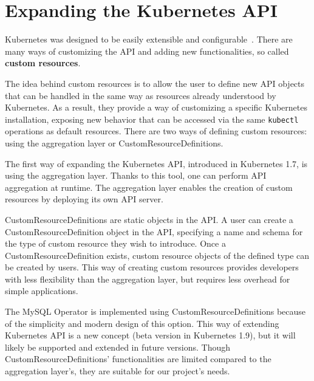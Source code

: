 \section{Expanding the Kubernetes API}
Kubernetes was designed to be easily extensible and configurable~\cite{extending-kubeapi}. There are
many ways of customizing the API and adding new functionalities, so called \textbf{custom resources}.

The idea behind custom resources is to allow the user to define new API objects that can be handled
in the same way as resources already understood by Kubernetes. As a result, they provide a way of
customizing a specific Kubernetes installation, exposing new behavior that can be accessed via the
same \texttt{kubectl} operations as default resources. There are two ways of defining custom resources: using
the aggregation layer or CustomResourceDefinitions.

The first way of expanding the Kubernetes API, introduced in Kubernetes 1.7, is using the
aggregation layer. Thanks to this tool, one can perform API aggregation at runtime. The aggregation
layer enables the creation of custom resources by deploying its own API server.

CustomResourceDefinitions are static objects in the API. A user can create a
CustomResourceDefinition object in the API, specifying a name and schema for the type of custom
resource they wish to introduce. Once a CustomResourceDefinition exists, custom resource objects of the defined type can
be created by users. This way of creating custom resources provides developers with less flexibility
than the aggregation layer, but requires less overhead for simple applications.

The MySQL Operator is implemented using CustomResourceDefinitions because of the simplicity and
modern design of this option. This way of extending Kubernetes API is a new concept (beta version in
Kubernetes 1.9), but it will likely be supported and extended in future versions. Though
CustomResourceDefinitions’ functionalities are limited compared to the aggregation layer’s, they
are suitable for our project’s needs.
